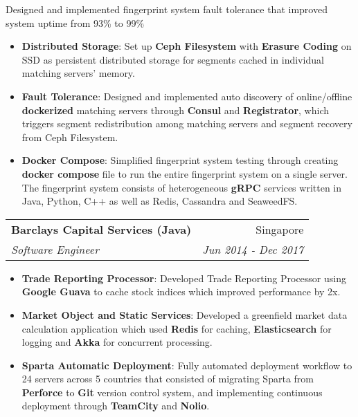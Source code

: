 \documentclass[letterpaper,11pt]{article}
\makeatletter
\newcommand{\resumeItem}[2]{
  \item\small{
    \textbf{#1}{: #2 \vspace{-2pt}}
  }
}
\newcommand{\resumeSubheading}[4]{
  \vspace{-1pt}\item
    \begin{tabular*}{0.97\textwidth}[t]{l@{\extracolsep{\fill}}r}
      \textbf{#1} & #2 \\
      \textit{\small#3} & \textit{\small #4} \\
    \end{tabular*}\vspace{-5pt}
}
\newcommand{\resumeItemListStart}{\begin{itemize}}
\newcommand{\resumeItemListEnd}{\end{itemize}\vspace{-6pt}}
\makeatother
\begin{document}
      \vspace{2pt}
      
      \small{Designed and implemented fingerprint system fault tolerance that improved system uptime from 93\% to 99\%}
      
      \vspace{-8pt}
            
      \resumeItemListStart
      
        \resumeItem{Distributed Storage}
          {Set up \textbf{Ceph Filesystem} with \textbf{Erasure Coding} on SSD as persistent distributed storage for segments cached in individual matching servers' memory.}
      
        \resumeItem{Fault Tolerance}
          {Designed and implemented auto discovery of online/offline \textbf{dockerized} matching servers through \textbf{Consul} and \textbf{Registrator}, which triggers segment redistribution among matching servers and segment recovery from Ceph Filesystem.}
                
        \resumeItem{Docker Compose}
          {Simplified fingerprint system testing through creating \textbf{docker compose} file to run the entire fingerprint system on a single server. The fingerprint system consists of heterogeneous \textbf{gRPC} services written in Java, Python, C++ as well as Redis, Cassandra and SeaweedFS.}
        
      \resumeItemListEnd
      
    \resumeSubheading
      {Barclays Capital Services (Java)}{Singapore}
      {Software Engineer}{Jun 2014 - Dec 2017}
      \resumeItemListStart
        \resumeItem{Trade Reporting Processor}
          {Developed Trade Reporting Processor using \textbf{Google Guava} to cache stock indices which improved performance by 2x.}
          
        \resumeItem{Market Object and Static Services}
          {Developed a greenfield market data calculation application which used \textbf{Redis} for caching, \textbf{Elasticsearch} for logging and \textbf{Akka} for concurrent processing.}
          
        \resumeItem{Sparta Automatic Deployment}
          {Fully automated deployment workflow to 24 servers across 5 countries that consisted of migrating Sparta from \textbf{Perforce} to \textbf{Git} version control system, and implementing continuous deployment through \textbf{TeamCity} and \textbf{Nolio}.}

      \resumeItemListEnd
      
\end{document}

